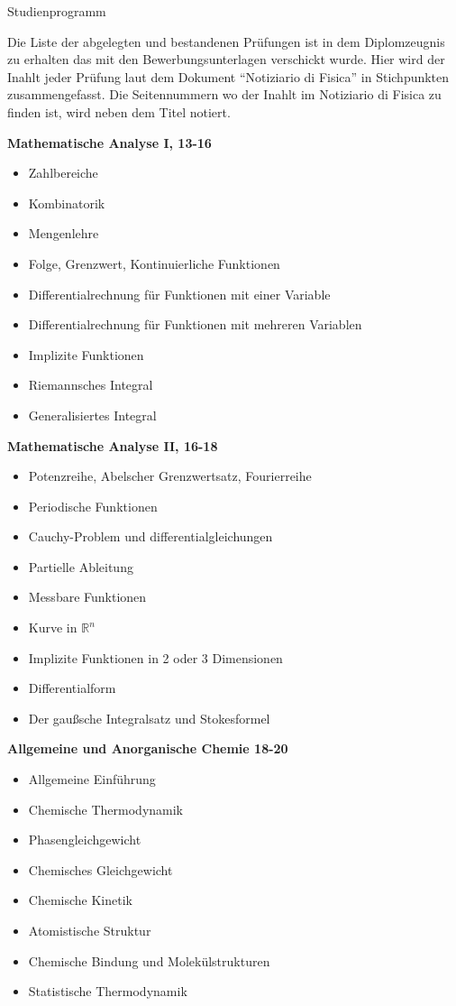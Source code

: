 \documentclass[a4paper,11pt]{article}
\begin{document}
\pagestyle{empty}
\begin{center}
  \huge{Studienprogramm}
\end{center}
\vspace{1cm}

Die Liste der abgelegten und bestandenen Pr\"ufungen ist in dem Diplomzeugnis zu
erhalten das mit den Bewerbungsunterlagen verschickt wurde. Hier wird der Inahlt
jeder Prüfung laut dem Dokument ``Notiziario di Fisica'' in Stichpunkten
zusammengefasst. Die Seitennummern wo der Inahlt im Notiziario di Fisica zu
finden ist, wird neben dem Titel notiert.

{\bfseries Mathematische Analyse I, 13-16}
\begin{itemize}
  \item Zahlbereiche
  \item Kombinatorik
  \item Mengenlehre
  \item Folge, Grenzwert, Kontinuierliche Funktionen
  \item Differentialrechnung für Funktionen mit einer Variable
  \item Differentialrechnung für Funktionen mit mehreren Variablen
  \item Implizite Funktionen
  \item Riemannsches Integral
  \item Generalisiertes Integral
\end{itemize}

{\bfseries Mathematische Analyse II, 16-18}
\begin{itemize}
  \item Potenzreihe, Abelscher Grenzwertsatz, Fourierreihe
  \item Periodische Funktionen
  \item Cauchy-Problem und differentialgleichungen
  \item Partielle Ableitung
  \item Messbare Funktionen
  \item Kurve in $\mathbb{R}^n$
  \item Implizite Funktionen in 2 oder 3 Dimensionen
  \item Differentialform
  \item Der gaußsche Integralsatz und Stokesformel
\end{itemize}

{\bfseries Allgemeine und Anorganische Chemie 18-20}
\begin{itemize}
  \item Allgemeine Einführung
  \item Chemische Thermodynamik
  \item Phasengleichgewicht
  \item Chemisches Gleichgewicht
  \item Chemische Kinetik
  \item Atomistische Struktur
  \item Chemische Bindung und Molekülstrukturen
  \item Statistische Thermodynamik
\end{itemize}
\end{document}
